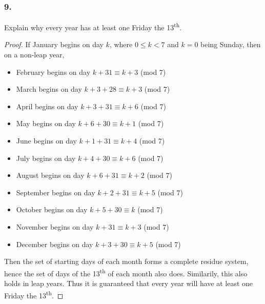 \subsubsection{9.} Explain why every year has at least one Friday the 13\textsuperscript{th}.

\begin{proof}
    If January begins on day $k$, where $0 \leq k < 7$ and $k = 0$ being Sunday,
    then on a non-leap year,
    \begin{itemize}
        \item February begins on day $k+31 \equiv k+3$ (mod 7)
        \item March begins on day $k+3+28 \equiv k+3$ (mod 7)
        \item April begins on day $k+3+31 \equiv k+6$ (mod 7)
        \item May begins on day $k+6+30 \equiv k+1$ (mod 7)
        \item June begins on day $k+1+31 \equiv k+4$ (mod 7)
        \item July begins on day $k+4+30 \equiv k+6$ (mod 7)
        \item August begins on day $k+6+31 \equiv k+2$ (mod 7)
        \item September begins on day $k+2+31 \equiv k+5$ (mod 7)
        \item October begins on day $k+5+30 \equiv k$ (mod 7)
        \item November begins on day $k+31 \equiv k+3$ (mod 7)
        \item December begins on day $k+3+30 \equiv k+5$ (mod 7)
    \end{itemize}
    Then the set of starting days of each month forms a complete residue system, hence
    the set of days of the 13\textsuperscript{th} of each month also does. Similarily, this
    also holds in leap years. Thus it is guaranteed that every year will have at least one
    Friday the 13\textsuperscript{th}.
\end{proof}


